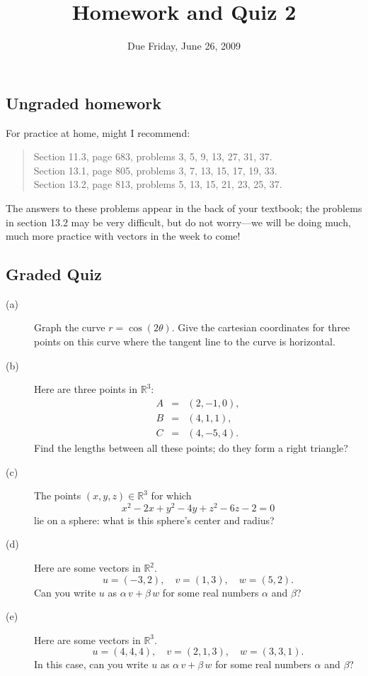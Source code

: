 \documentclass[12pt]{article}
\title{Homework and Quiz 2}
\date{Due Friday, June 26, 2009}
\newcommand{\R}{\mathbb{R}}
\begin{document}
\maketitle

\subsection*{Ungraded homework}

For practice at home, might I recommend:
\begin{quote}
Section 11.3, page 683, problems 3, 5, 9, 13, 27, 31, 37. \\
Section 13.1, page 805, problems 3, 7, 13, 15, 17, 19, 33. \\
Section 13.2, page 813, problems 5, 13, 15, 21, 23, 25, 37.
\end{quote}
The answers to these problems appear in the back of your textbook; the
problems in section 13.2 may be very difficult, but do not worry---we
will be doing much, much more practice with vectors in the week to
come!

\vfill

\subsection*{Graded Quiz}

\begin{description}
\item[(a)] Graph the curve $r = \cos \left( 2\theta \right)$.  Give
  the  cartesian coordinates for three points on this curve
  where the tangent line to the curve is horizontal.
\vfill
\item[(b)] Here are three points in $\R^3$:
\begin{eqnarray*}
A &=& (2,-1,0), \\
B &=& (4,1,1), \\
C &=& (4,-5,4).
\end{eqnarray*}
Find the lengths between all these points; do they form a right triangle?
\vfill
\item[(c)] The points $(x,y,z) \in \R^3$ for which
$$
x^2-2 x+y^2-4 y+z^2-6 z- 2 = 0
$$
lie on a sphere: what is this sphere's center and radius?
\vfill
\item[(d)] Here are some vectors in $\R^2$.
$$
u = (-3,2), \hspace{1em}
v = (1,3), \hspace{1em}
w = (5,2). 
$$
Can you write $u$ as $\alpha \, v + \beta \, w$ for some real numbers
$\alpha$ and $\beta$?
\vfill
\item[(e)] Here are some vectors in $\R^3$.
$$
u = (4,4,4), \hspace{1em}
v = (2,1,3), \hspace{1em}
w = (3,3,1). 
$$
In this case, can you write $u$ as $\alpha \, v + \beta \, w$ for some real numbers $\alpha$ and $\beta$?
\vfill
\end{description}
\end{document}
